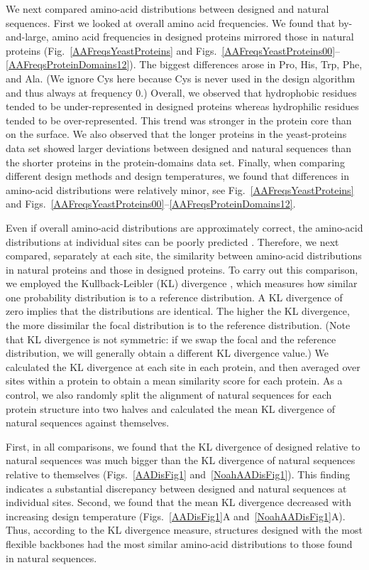 \documentclass[12pt]{article}
\begin{document}
We next compared amino-acid distributions between designed and natural sequences. First we looked at overall amino acid frequencies. We found that by-and-large, amino acid frequencies in designed proteins mirrored those in natural proteins (Fig.~\ref{AAFreqsYeastProteins} and Figs.~\ref{AAFreqsYeastProteins00}--\ref{AAFreqsProteinDomains12}). The biggest differences arose in Pro, His, Trp, Phe, and Ala. (We ignore Cys here because Cys is never used in the design algorithm and thus always at frequency 0.) Overall, we observed that hydrophobic residues tended to be under-represented in designed proteins whereas hydrophilic residues tended to be over-represented. This trend was stronger in the protein core than on the surface. We also observed that the longer proteins in the yeast-proteins data set showed larger deviations between designed and natural sequences than the shorter proteins in the protein-domains data set. Finally, when comparing different design methods and design temperatures, we found that differences in amino-acid distributions were relatively minor, see Fig.~\ref{AAFreqsYeastProteins} and Figs.~\ref{AAFreqsYeastProteins00}--\ref{AAFreqsProteinDomains12}.

Even if overall amino-acid distributions are approximately correct, the amino-acid distributions at individual sites can be poorly predicted \citep{Ramsey2011}. Therefore, we next compared, separately at each site, the similarity between amino-acid distributions in natural proteins and those in designed proteins. To carry out this comparison, we employed the Kullback-Leibler (KL) divergence \citep{Wasserman2004}, which measures how similar one probability distribution is to a reference distribution. A KL divergence of zero implies that the distributions are identical. The higher the KL divergence, the more dissimilar the focal distribution is to the reference distribution. (Note that KL divergence is not symmetric: if we swap the focal and the reference distribution, we will generally obtain a different KL divergence value.) We calculated the KL divergence at each site in each protein, and then averaged over sites within a protein to obtain a mean similarity score for each protein. As a control, we also randomly split the alignment of natural sequences for each protein structure into two halves and calculated the mean KL divergence of natural sequences against themselves.

First, in all comparisons, we found that the KL divergence of designed relative to natural sequences was much bigger than the KL divergence of natural sequences relative to themselves (Figs.~\ref{AADisFig1} and~\ref{NoahAADisFig1}). This finding indicates a substantial discrepancy between designed and natural sequences at individual sites. Second, we found that the mean KL divergence decreased with increasing design temperature (Figs.~\ref{AADisFig1}A and~\ref{NoahAADisFig1}A). Thus, according to the KL divergence measure, structures designed with the most flexible backbones had the most similar amino-acid distributions to those found in natural sequences.
\end{document}
